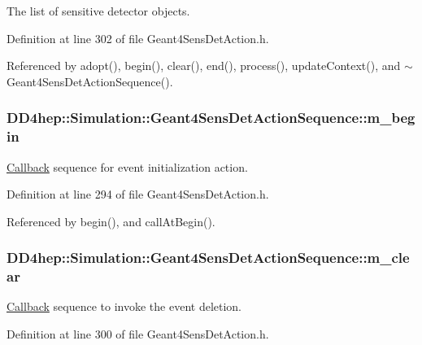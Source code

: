 The list of sensitive detector objects. 

Definition at line 302 of file Geant4SensDetAction.h.

Referenced by adopt(), begin(), clear(), end(), process(), updateContext(), and $\sim$Geant4SensDetActionSequence().\hypertarget{class_d_d4hep_1_1_simulation_1_1_geant4_sens_det_action_sequence_a8feceb005db2ea028c4a778dd600b00b}{
\subsubsection[{m\_\-begin}]{ {\bf DD4hep::Simulation::Geant4SensDetActionSequence::m\_\-begin}}}
\label{class_d_d4hep_1_1_simulation_1_1_geant4_sens_det_action_sequence_a8feceb005db2ea028c4a778dd600b00b}


\hyperlink{class_d_d4hep_1_1_callback}{Callback} sequence for event initialization action. 

Definition at line 294 of file Geant4SensDetAction.h.

Referenced by begin(), and callAtBegin().\hypertarget{class_d_d4hep_1_1_simulation_1_1_geant4_sens_det_action_sequence_a5d720697074ed4775143ebdae2073a16}{
\subsubsection[{m\_\-clear}]{ {\bf DD4hep::Simulation::Geant4SensDetActionSequence::m\_\-clear}}}
\label{class_d_d4hep_1_1_simulation_1_1_geant4_sens_det_action_sequence_a5d720697074ed4775143ebdae2073a16}


\hyperlink{class_d_d4hep_1_1_callback}{Callback} sequence to invoke the event deletion. 

Definition at line 300 of file Geant4SensDetAction.h.

